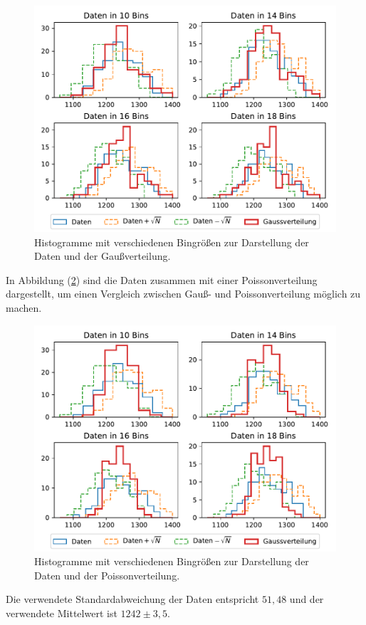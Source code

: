 \begin{figure}[H]
    \centering
    \includegraphics[width=\textwidth]{Plots/plot5.pdf}
    \caption{Histogramme mit verschiedenen Bingrößen zur Darstellung der Daten und der Gaußverteilung.}
    \label{fig:Gauss}
\end{figure}
In Abbildung (\ref{fig:Poisson}) sind die Daten zusammen mit einer Poissonverteilung dargestellt, um einen Vergleich zwischen Gauß- und Poissonverteilung möglich 
zu machen.
\begin{figure}[H]
    \centering
    \includegraphics[width=\textwidth]{Plots/plot6.pdf}
    \caption{Histogramme mit verschiedenen Bingrößen zur Darstellung der Daten und der Poissonverteilung.}
    \label{fig:Poisson}
\end{figure}
Die verwendete Standardabweichung der Daten entspricht $51,48$ und der verwendete Mittelwert ist $1242 \pm 3,5 $. 
